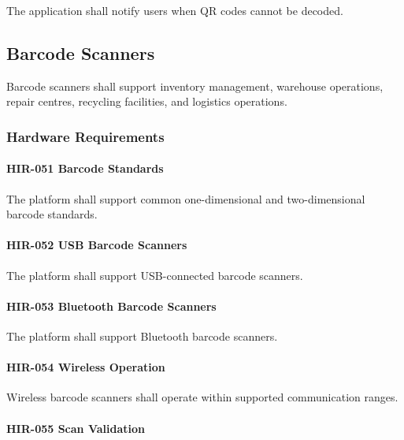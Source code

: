 The application shall notify users when QR codes cannot be decoded.


\subsection{Barcode Scanners}

Barcode scanners shall support inventory management, warehouse
operations, repair centres, recycling facilities, and logistics
operations.


\subsubsection*{Hardware Requirements}

\paragraph{HIR-051 Barcode Standards}

The platform shall support common one-dimensional and
two-dimensional barcode standards.

\paragraph{HIR-052 USB Barcode Scanners}

The platform shall support USB-connected barcode scanners.

\paragraph{HIR-053 Bluetooth Barcode Scanners}

The platform shall support Bluetooth barcode scanners.

\paragraph{HIR-054 Wireless Operation}

Wireless barcode scanners shall operate within supported communication
ranges.

\paragraph{HIR-055 Scan Validation}

